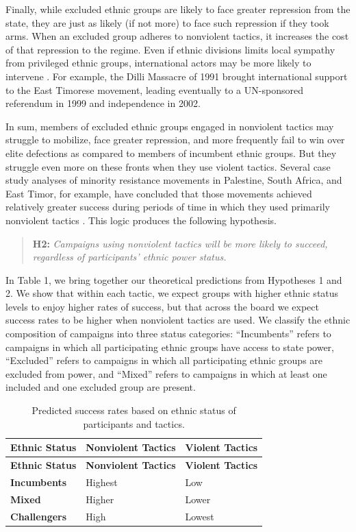 \documentclass[
  letterpaper,
  DIV=11,
  numbers=noendperiod]{scrartcl}
\begin{document}
Finally, while excluded ethnic groups are likely to face greater
repression from the state, they are just as likely (if not more) to face
such repression if they took arms. When an excluded group adheres to
nonviolent tactics, it increases the cost of that repression to the
regime. Even if ethnic divisions limits local sympathy from privileged
ethnic groups, international actors may be more likely to intervene
\autocite{Cunningham2023}. For example, the Dilli Massacre of 1991
brought international support to the East Timorese movement, leading
eventually to a UN-sponsored referendum in 1999 and independence in
2002.

In sum, members of excluded ethnic groups engaged in nonviolent tactics
may struggle to mobilize, face greater repression, and more frequently
fail to win over elite defections as compared to members of incumbent
ethnic groups. But they struggle even more on these fronts when they use
violent tactics. Several case study analyses of minority resistance
movements in Palestine, South Africa, and East Timor, for example, have
concluded that those movements achieved relatively greater success
during periods of time in which they used primarily nonviolent tactics
\autocites[138-145]{Chenoweth2011}{Barrell1992,Zunes1999b,MacLeod2015,Stephan2008}.
This logic produces the following hypothesis.

\begin{quote}
\textbf{H2:} \emph{Campaigns using nonviolent tactics will be more
likely to succeed, regardless of participants' ethnic power status.}
\end{quote}

In Table 1, we bring together our theoretical predictions from
Hypotheses 1 and 2. We show that within each tactic, we expect groups
with higher ethnic status levels to enjoy higher rates of success, but
that across the board we expect success rates to be higher when
nonviolent tactics are used. We classify the ethnic composition of
campaigns into three status categories: ``Incumbents'' refers to
campaigns in which all participating ethnic groups have access to state
power, ``Excluded'' refers to campaigns in which all participating
ethnic groups are excluded from power, and ``Mixed'' refers to campaigns
in which at least one included and one excluded group are present.

\begin{longtable}[]{@{}lll@{}}
\caption{Predicted success rates based on ethnic status of participants
and tactics.}\tabularnewline
\toprule\noalign{}
\textbf{Ethnic Status} & \textbf{Nonviolent Tactics} & \textbf{Violent
Tactics} \\
\midrule\noalign{}
\endfirsthead
\toprule\noalign{}
\textbf{Ethnic Status} & \textbf{Nonviolent Tactics} & \textbf{Violent
Tactics} \\
\midrule\noalign{}
\endhead
\bottomrule\noalign{}
\endlastfoot
\textbf{Incumbents} & Highest & Low \\
\textbf{Mixed} & Higher & Lower \\
\textbf{Challengers} & High & Lowest \\
\end{longtable}
\end{document}
